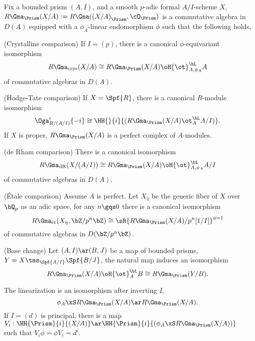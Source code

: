 \documentclass[article, a4paper, twoside]{universal}
\begin{document}
\begin{thm}
	Fix a bounded prism $(A,I)$, and a smooth $p$-adic formal $A/I$-scheme $X$, $R\Gma_{\Prism}(X/A):=R\Gma({(X/A)}_{\Prism},\cO_{\Prism})$ is a commutative algebra in $D(A)$ equipped with a $\phi_{A}$-linear endomorphism $\phi$ such that the following holds,
	\begin{enr}[label=(\arabic*)]
		\item (Crystalline comparison) If $I=(p)$, there is a canonical $\phi$-equivariant isomorphism
		\[
			R\Gma_{\text{crys}}(X/A)\cong R\Gma_{\Prism}(X/A)\oH{\ot}^{\bL}_{A,\phi_{A}}A
		\]
		of commutative algebras in $D(A)$.
		\item (Hodge-Tate comparison) If $X=\Spf{R}$, there is a canonical $R$-module isomorphism
		\[
			\Oga_{R/(A/I)}^{i}\{-i\}\cong\HH{}{i}{(R\Gma_{\Prism}(X/A)\ot_{A}^{\bL}A/I)}.
		\]
		If $X$ is proper, $R\Gma_{\Prism}(X/A)$ is a perfect complex of $A$-modules.
		\item (de Rham comparison) There is a canonical isomorphism
		\[
			R\Gma_{\text{dR}}(X/(A/I))\cong R\Gma_{\Prism}(X/A)\oH{\ot}^{\bL}_{A,\phi_{A}}A/I
		\]
		of commutative algebras in $D(A)$.
		\item ({\'E}tale comparison) Assume $A$ is perfect. Let $X_{\eta}$ be the generic fiber of $X$ over $\bQ_{p}$ as an adic space, for any $n\gqs0$ there is a canonical isomorphism
		\[
			R\Gma_{\text{{\'e}t}}(X_{\eta},\bZ/p^{n}\bZ)\cong\sR{R\Gma_{\Prism}(X/A)/p^{n}[1/I]}^{\phi=1}
		\]
		of commutative algebras in $D(\bZ/p^{n}\bZ)$.
		\item (Base change) Let $(A,I)\ar(B,J)$ be a map of bounded prisms, $Y=X\tms_{\Spf{A/I}}\Spf{B/J}$, the natural map induces an isomorphism
		\[
			R\Gma_{\Prism}(X/A)\oH{\ot}_{A}^{\bL}B\cong R\Gma_{\Prism}(Y/B).
		\]
		\item The linearization is an isomorphism after inverting $I$,
		\[
			\phi_{A}\xS R\Gma_{\Prism}(X/A)\ar R\Gma_{\Prism}(X/A).
		\]
		If $I=(d)$ is principal, there is a map $V_{i}:\HH{\Prism}{i}{(X/A)}\ar\HH{\Prism}{i}{(\phi_{A}\xS R\Gma_{\Prism}(X/A))}$ such that $V_{i}\phi=\phi V_{i}=d^{i}$.
	\end{enr}
\end{thm}




\printref
\end{document}

